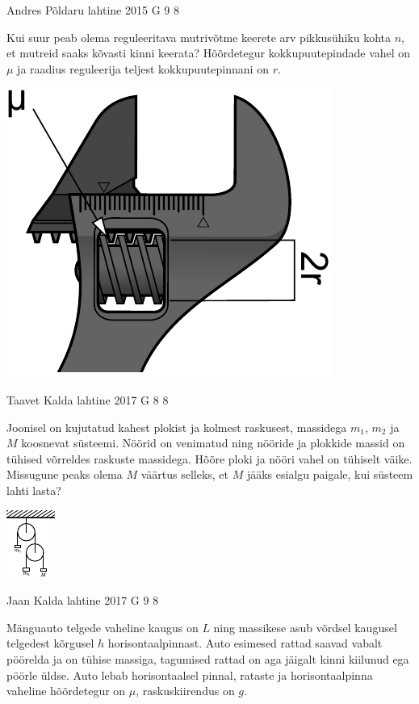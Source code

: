 \documentclass[11pt, twoside]{article}
\begin{document}
{%
{Andres Põldaru} %
{lahtine} %
{2015} %
{G 9} %
{8} %
{
\ifStatement
Kui suur peab olema reguleeritava mutrivõtme keerete arv pikkusühiku kohta $n$, et mutreid saaks kõvasti kinni keerata? Hõõrdetegur kokkupuutepindade vahel on $\mu$ ja raadius reguleerija teljest kokkupuutepinnani on $r$.
\begin{center}%
\includegraphics[width=0.4\linewidth]{2015-lahg-09-mutriv6ti_joonis}%
\end{center}
\fi
}

{Taavet Kalda} %
{lahtine} %
{2017} %
{G 8} %
{8} %
{
\ifStatement
Joonisel on kujutatud kahest plokist ja kolmest raskusest, massidega $m_1$, $m_2$ ja $M$ koosnevat süsteemi. Nöörid on venimatud ning nööride ja plokkide massid on tühised võrreldes raskuste massidega. Hõõre ploki ja nööri vahel on tühiselt väike. Missugune peaks olema $M$ väärtus selleks, et $M$ jääks esialgu paigale, kui süsteem lahti lasta?

\begin{center}
	\vspace{-10pt}
	\includegraphics[width = 0.3\linewidth] {2017-lahg-08-double_pulleys_img.pdf}
\end{center}
\fi
}

{Jaan Kalda} %
{lahtine} %
{2017} %
{G 9} %
{8} %
{
\ifStatement
Mänguauto telgede vaheline kaugus on $L$ ning massikese asub võrdsel kaugusel telgedest kõrgusel $h$ horisontaalpinnast. Auto esimesed rattad saavad vabalt pöörelda ja on tühise massiga, tagumised rattad on aga jäigalt kinni kiilunud ega pöörle üldse. Auto lebab horisontaalsel pinnal, rataste ja horisontaalpinna vaheline hõõrdetegur on $\mu$, raskuskiirendus on $g$.

}}
\end{document}
